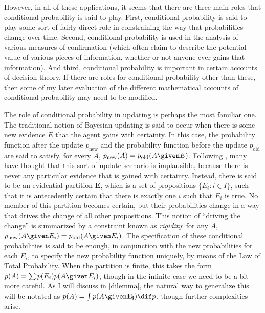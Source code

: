 However, in all of these applications, it seems that there are three main roles that conditional probability is said to play. First, conditional probability is said to play some sort of fairly direct role in constraining the way that probabilities change over time. Second, conditional probability is used in the analysis of various measures of confirmation (which often claim to describe the potential value of various pieces of information, whether or not anyone ever gains that information). And third, conditional probability is important in certain accounts of decision theory. If there are roles for conditional probability other than these, then some of my later evaluation of the different mathematical accounts of conditional probability may need to be modified.

The role of conditional probability in updating is perhaps the most familiar one. The traditional notion of Bayesian updating is said to occur when there is some new evidence $E$ that the agent gains with certainty. In this case, the probability function after the update $p_{\text{new}}$ and the probability function before the update $p_{\text{old}}$ are said to satisfy, for every $A$, $p_{\text{new}}(A)=p_{\text{old}}(A \given E)$. Following \citet{jeffrey}, many have thought that this sort of update scenario is implausible, because there is never any particular evidence that is gained with certainty. Instead, there is said to be an evidential partition $\mathbf{E}$, which is a set of propositions $\{E_i\colon i\in I\}$, such that it is antecedently certain that there is exactly one $i$ such that $E_i$ is true. No member of this partition becomes certain, but their probabilities change in a way that drives the change of all other propositions. This notion of ``driving the change'' is summarized by a constraint known as \textit{rigidity}: for any $A$, $p_{\text{new}}(A \given E_i)=p_{\text{old}}(A \given E_i)$. The specification of these conditional probabilities is said to be enough, in conjunction with the new probabilities for each $E_i$, to specify the new probability function uniquely, by means of the Law of Total Probability. When the partition is finite, this takes the form $p(A)=\sum p(E_i)p(A \given E_i)$, though in the infinite case we need to be a bit more careful. As I will discuss in \autoref{dilemma}, the natural way to generalize this will be notated as $p(A)=\int p(A \given \mathbf{E_i}) \dif p$, though further complexities arise.


